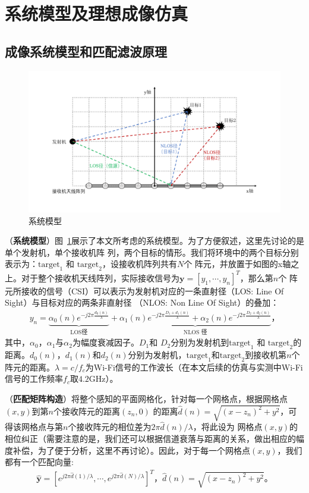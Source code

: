 \section{系统模型及理想成像仿真}
\subsection{成像系统模型和匹配滤波原理}
\begin{figure}[htb]
  \centering
  \includegraphics[width=\textwidth]{figures/system_model.pdf}
  \caption{系统模型}
  \label{系统模型}
\end{figure}
（\textbf{系统模型}）图~\ref{系统模型}展示了本文所考虑的系统模型。为了方便叙述，这里先讨论的是单个发射机，单个接收机阵
列，两个目标的情形。我们将环境中的两个目标分别表示为：$\text{target}_1$ 和 $\text{target}_2$，设接收机阵列共有$N$个
阵元，并放置于如图的x轴之上。对于整个接收机天线阵列，实际接收信号为$\boldsymbol{y}=[y_1,\cdots,y_n]^T$，那么第$n$个
阵元所接收的信号（CSI）可以表示为发射机对应的一条直射径（LOS: Line Of Sight）与目标对应的两条非直射径
（NLOS: Non Line Of Sight）的叠加\cite{ma2019wifi}：
\begin{align}
  y_n = \underbrace{\alpha_0(n)e^{-j2\pi\frac{d_0(n)}{\lambda}}}_{\text{LOS径}} + \underbrace{\alpha _1(n)e^{ - j2\pi \frac{D_1 + d_1(n)}{\lambda }} + \alpha _2(n)e^{ - j2\pi \frac{D_2 + d_2(n)}{\lambda }}}_{\text{NLOS 径}}\text{，}
\end{align}
其中，$\alpha_0$，$\alpha_1$与$\alpha_2$为幅度衰减因子。$D_1$和 $D_2$分别为发射机到$\text{target}_1$ 和 $\text{target}_2$的距离。$d_0(n)$，$d_1(n)$和$d_2(n)$分别为发射机，$\text{target}_1$和$\text{target}_2$到接收机第$n$个阵元的距离。$\lambda = c/f_c$为Wi-Fi信号的工作波长（在本文后续的仿真与实测中Wi-Fi信号的工作频率$f_c$取$4.2$GHz）。


（\textbf{匹配矩阵构造}）将整个感知的平面网格化，针对每一个网格点，根据网格点$(x,y)$到第$n$个接收阵元的距离$(z_n,0)$
的距离$\hat{d}(n)=\sqrt{(x-z_n)^2+y^2}$，可得该网格点与第$n$个接收阵元的相位差为$2\pi\hat{d}(n)/\lambda$，将此设为
网格点$(x,y)$的相位纠正（需要注意的是，我们还可以根据信道衰落与距离的关系，做出相应的幅度补偿，为了便于分析，这里不再讨论）。因此，对于每一个网格点$(x,y)$，我们都有一个匹配向量:
\begin{align}
  \hat{\boldsymbol{y}}=[e^{j2\pi \hat{d}(1)/\lambda} ,\cdots,e^{j2\pi \hat{d}(N)/\lambda}]^T \text{，} \hat{d}(n)=\sqrt{(x-z_n)^2+y^2} \text{。}
  \label{matched array}
\end{align}


